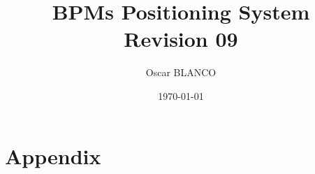 \documentclass[a4paper,11pt]{book}
\title{BPMs Positioning System\\{\small Revision 09}}
\author{Oscar BLANCO}
\date{\today}
\begin{document}
\maketitle
\tableofcontents
\listoffigures
\listoftables
\frontmatter

\mainmatter




\appendix
\chapter{Appendix}



\backmatter

\end{document}
